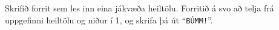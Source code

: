 \begin{problem}
	Skrifið forrit sem les inn eina jákvæða heiltölu. Forritið á svo að telja frá uppgefinni heiltölu og niður í 1, og skrifa þá út "`\texttt{BÚMM!}"'.

\begin{example}
%
\end{example}
\end{problem}